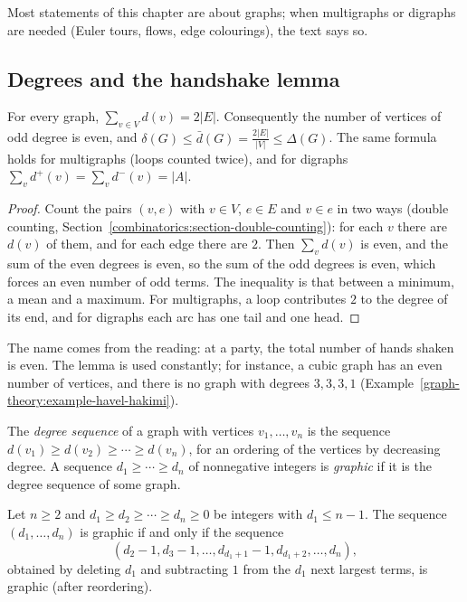 Most statements of this chapter are about graphs; when multigraphs or digraphs are needed (Euler tours, flows, edge colourings), the text says so.

\subsection{Degrees and the handshake lemma}\label{graph-theory:subsection-degrees}

\begin{proposition}\label{graph-theory:proposition-handshake}
For every graph, $\sum_{v \in V}d(v) = 2|E|$. Consequently the number of vertices of odd degree is even, and $\delta(G) \leq \bar{d}(G) = \frac{2|E|}{|V|} \leq \Delta(G)$. The same formula holds for
multigraphs (loops counted twice), and for digraphs $\sum_vd^+(v) = \sum_vd^-(v) = |A|$.
\end{proposition}

\begin{proof}
Count the pairs $(v, e)$ with $v \in V$, $e \in E$ and $v \in e$ in two ways (double counting, Section~\ref{combinatorics:section-double-counting}): for each $v$ there are $d(v)$ of them, and
for each edge there are $2$. Then $\sum_vd(v)$ is even, and the sum of the even degrees is even, so the sum of the odd degrees is even, which forces an even number of odd terms. The inequality
is that between a minimum, a mean and a maximum. For multigraphs, a loop contributes $2$ to the degree of its end, and for digraphs each arc has one tail and one head.
\end{proof}

The name comes from the reading: at a party, the total number of hands shaken is even. The lemma is used constantly; for instance, a cubic graph has an even number of vertices, and
there is no graph with degrees $3, 3, 3, 1$ (Example~\ref{graph-theory:example-havel-hakimi}).

\begin{definition}\label{graph-theory:definition-degree-sequence}
The \emph{degree sequence} of a graph with vertices $v_1, \ldots, v_n$ is the sequence $d(v_1) \geq d(v_2) \geq \cdots \geq d(v_n)$, for an ordering of the vertices by decreasing
degree. A sequence $d_1 \geq \cdots \geq d_n$ of nonnegative integers is \emph{graphic} if it is the degree sequence of some graph.
\end{definition}

\begin{theorem}\label{graph-theory:theorem-havel-hakimi}
Let $n \geq 2$ and $d_1 \geq d_2 \geq \cdots \geq d_n \geq 0$ be integers with $d_1 \leq n - 1$. The sequence $(d_1, \ldots, d_n)$ is graphic if and only if the sequence
\[
(d_2 - 1, d_3 - 1, \ldots, d_{d_1+1} - 1, d_{d_1+2}, \ldots, d_n),
\]
obtained by deleting $d_1$ and subtracting $1$ from the $d_1$ next largest terms, is graphic (after reordering).
\end{theorem}

